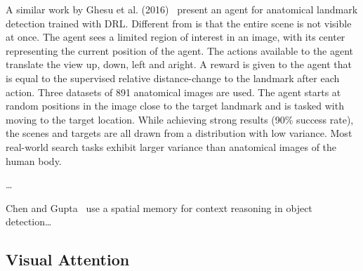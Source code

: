 
% 

A similar work by Ghesu et al. (2016)~\cite{ghesu_artificial_2016} present an agent for anatomical landmark detection trained with DRL.
Different from \cite{caicedo_active_2015} is that the entire scene is not visible at once.
The agent sees a limited region of interest in an image, with its center representing the current position of the agent.
The actions available to the agent translate the view up, down, left and aright.
A reward is given to the agent that is equal to the supervised relative distance-change to the landmark after each action.
Three datasets of 891 anatomical images are used.
The agent starts at random positions in the image close to the target landmark and is tasked with moving to the target location.
While achieving strong results (90\% success rate), the scenes and targets are all drawn from a distribution with low variance.
Most real-world search tasks exhibit larger variance than anatomical images of the human body.

\cite{uzkent_detection_2020}\dots



Chen and Gupta~\cite{chen_memory_2017} use a spatial memory for context reasoning in object detection\dots

\subsection{Visual Attention}



